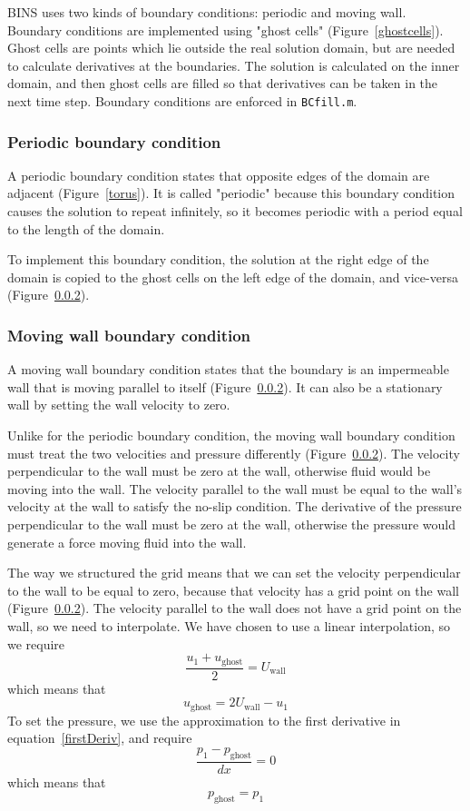 \documentclass[12pt]{article}
\begin{document}
BINS uses two kinds of boundary conditions: periodic and moving wall.  Boundary conditions are implemented using "ghost cells" (Figure~\ref{ghostcells}).  Ghost cells are points which lie outside the real solution domain, but are needed to calculate derivatives at the boundaries.  The solution is calculated on the inner domain, and then ghost cells are filled so that derivatives can be taken in the next time step.  Boundary conditions are enforced in \texttt{BCfill.m}.

\subsubsection{Periodic boundary condition}
\label{periodicBCs}
A periodic boundary condition states that opposite edges of the domain are adjacent (Figure~\ref{torus}).  It is called "periodic" because this boundary condition causes the solution to repeat infinitely, so it becomes periodic with a period equal to the length of the domain.

To implement this boundary condition, the solution at the right edge of the domain is copied to the ghost cells on the left edge of the domain, and vice-versa (Figure~\ref{}).  

\subsubsection{Moving wall boundary condition}
A moving wall boundary condition states that the boundary is an impermeable wall that is moving parallel to itself (Figure~\ref{}).  It can also be a stationary wall by setting the wall velocity to zero.

Unlike for the periodic boundary condition, the moving wall boundary condition must treat the two velocities and pressure differently (Figure~\ref{}).  The velocity perpendicular to the wall must be zero at the wall, otherwise fluid would be moving into the wall.  The velocity parallel to the wall must be equal to the wall's velocity at the wall to satisfy the no-slip condition.  The derivative of the pressure perpendicular to the wall must be zero at the wall, otherwise the pressure would generate a force moving fluid into the wall.

The way we structured the grid means that we can set the velocity perpendicular to the wall to be equal to zero, because that velocity has a grid point on the wall (Figure~\ref{}).  The velocity parallel to the wall does not have a grid point on the wall, so we need to interpolate. We have chosen to use a linear interpolation, so we require
\[ \frac{u_1 + u_{\mathrm{ghost}}}{2} = U_{\mathrm{wall}}\]
which means that
\begin{equation}
u_{\mathrm{ghost}} = 2U_{\mathrm{wall}} - u_1
\end{equation}
To set the pressure, we use the approximation to the first derivative in equation~\ref{firstDeriv}, and require
\[ \frac{p_1 - p_{\mathrm{ghost}}}{dx} = 0\]
which means that
\begin{equation}
p_{\mathrm{ghost}} = p_1
\end{equation}
\end{document}
